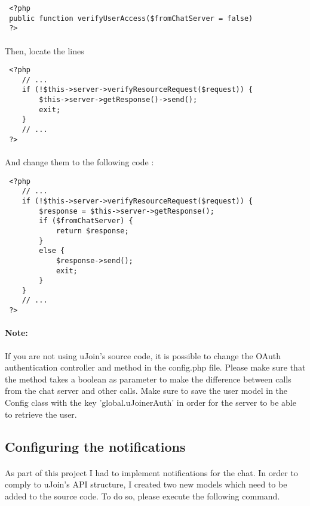\begin{verbatim}
 <?php
 public function verifyUserAccess($fromChatServer = false)
 ?>
\end{verbatim}

\paragraph{} Then, locate the lines


\begin{verbatim}
 <?php
    // ...
    if (!$this->server->verifyResourceRequest($request)) {
        $this->server->getResponse()->send();
        exit;
    }
    // ...
 ?>
\end{verbatim}

\paragraph{} And change them to the following code :

\begin{verbatim}
 <?php
    // ...
    if (!$this->server->verifyResourceRequest($request)) {
        $response = $this->server->getResponse();
        if ($fromChatServer) {
            return $response;
        }
        else {
            $response->send();
            exit;
        }
    }
    // ...
 ?>
\end{verbatim}

\paragraph{Note:} If you are not using uJoin's source code, it is possible to 
change the OAuth authentication controller and method in the config.php file. 
Please make sure that the method takes a boolean as parameter to make the 
difference between calls from the chat server and other calls. Make sure to 
save the user model in the Config class with the key 'global.uJoinerAuth' in 
order for the server to be able to retrieve the user.

\subsection{Configuring the notifications}

\paragraph{} As part of this project I had to implement notifications for the 
chat. In order to comply to uJoin's API structure, I created two new models 
which need to be added to the source code. To do so, please execute the 
following command.

